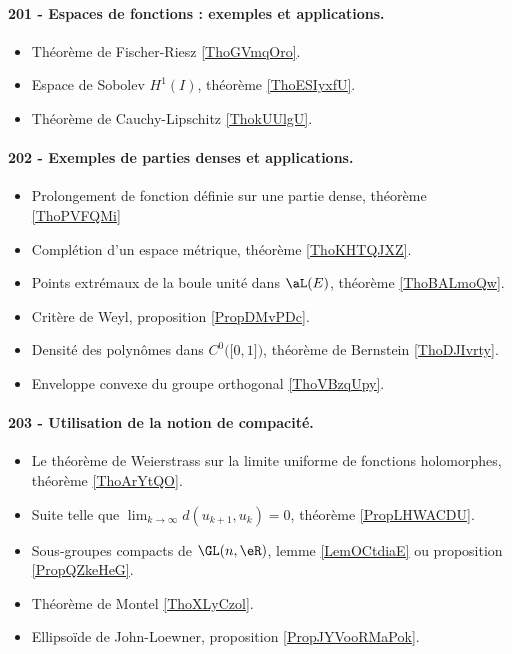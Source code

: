 \paragraph{201 - Espaces de fonctions : exemples et applications.}
\begin{itemize}
    \item Théorème de Fischer-Riesz \ref{ThoGVmqOro}.
    \item Espace de Sobolev \( H^1(I)\), théorème \ref{ThoESIyxfU}.
    \item Théorème de Cauchy-Lipschitz \ref{ThokUUlgU}.
\end{itemize}
\paragraph{202 - Exemples de parties denses et applications.}
\begin{itemize}
    \item Prolongement de fonction définie sur une partie dense, théorème \ref{ThoPVFQMi}
    \item Complétion d'un espace métrique, théorème \ref{ThoKHTQJXZ}.
    \item Points extrémaux de la boule unité dans \( \aL(E)\), théorème \ref{ThoBALmoQw}.
    \item Critère de Weyl, proposition \ref{PropDMvPDc}.
    \item Densité des polynômes dans \( C^0\big( \mathopen[ 0 , 1 \mathclose] \big)\), théorème de Bernstein \ref{ThoDJIvrty}.
    \item Enveloppe convexe du groupe orthogonal \ref{ThoVBzqUpy}.
\end{itemize}
\paragraph{203 - Utilisation de la notion de compacité.}
\begin{itemize}
    \item Le théorème de Weierstrass sur la limite uniforme de fonctions holomorphes, théorème \ref{ThoArYtQO}.
    \item Suite telle que \( \lim_{k\to \infty} d(u_{k+1},u_k)=0\), théorème \ref{PropLHWACDU}.
    \item Sous-groupes compacts de \( \GL(n,\eR)\), lemme \ref{LemOCtdiaE} ou proposition \ref{PropQZkeHeG}.
    \item Théorème de Montel \ref{ThoXLyCzol}.
    \item Ellipsoïde de John-Loewner, proposition \ref{PropJYVooRMaPok}.
\end{itemize}
